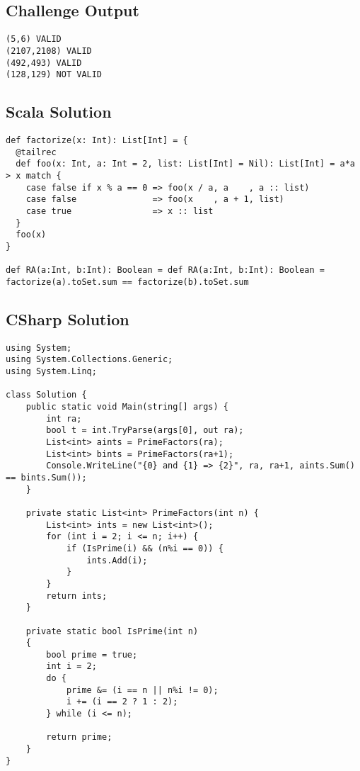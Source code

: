 \subsection{Challenge Output}\label{challenge-output-4}

\begin{verbatim}
(5,6) VALID
(2107,2108) VALID
(492,493) VALID
(128,129) NOT VALID
\end{verbatim}

\subsection{Scala Solution}\label{scala-solution-6}

\begin{verbatim}
def factorize(x: Int): List[Int] = {
  @tailrec
  def foo(x: Int, a: Int = 2, list: List[Int] = Nil): List[Int] = a*a > x match {
    case false if x % a == 0 => foo(x / a, a    , a :: list)
    case false               => foo(x    , a + 1, list)
    case true                => x :: list
  }
  foo(x)
}

def RA(a:Int, b:Int): Boolean = def RA(a:Int, b:Int): Boolean =  factorize(a).toSet.sum == factorize(b).toSet.sum
\end{verbatim}

\subsection{CSharp Solution}\label{csharp-solution}

\begin{verbatim}
using System;
using System.Collections.Generic;
using System.Linq;

class Solution {
    public static void Main(string[] args) {
        int ra;
        bool t = int.TryParse(args[0], out ra);
        List<int> aints = PrimeFactors(ra);
        List<int> bints = PrimeFactors(ra+1);
        Console.WriteLine("{0} and {1} => {2}", ra, ra+1, aints.Sum() == bints.Sum());
    }

    private static List<int> PrimeFactors(int n) {
        List<int> ints = new List<int>();
        for (int i = 2; i <= n; i++) {
            if (IsPrime(i) && (n%i == 0)) {
                ints.Add(i);
            }
        }
        return ints;
    }

    private static bool IsPrime(int n)
    {
        bool prime = true;
        int i = 2;
        do {
            prime &= (i == n || n%i != 0);
            i += (i == 2 ? 1 : 2);
        } while (i <= n);

        return prime;
    }
}
\end{verbatim}

